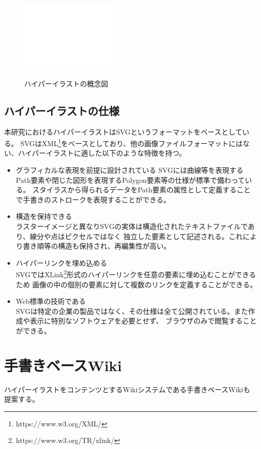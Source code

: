\begin{figure}[htbp]
    \begin{center}
    {\includegraphics[width=50mm]{images/testimage.png}} \end{center}
    \caption{ハイパーイラストの概念図}
\end{figure}

\subsection{ハイパーイラストの仕様}
本研究におけるハイパーイラストはSVG\cite{aboutsvg}というフォーマットをベースとしている。
SVGはXML\footnote{https://www.w3.org/XML/}をベースとしており、他の画像ファイルフォーマットにはない、ハイパーイラストに適した以下のような特徴を持つ。
\begin{itemize}
    \item グラフィカルな表現を前提に設計されている
    SVGには曲線等を表現するPath要素や閉じた図形を表現するPolygon要素等の仕様が標準で備わっている。
    スタイラスから得られるデータをPath要素の属性として定義することで手書きのストロークを表現することができる。
    \item 構造を保持できる\\
    ラスターイメージと異なりSVGの実体は構造化されたテキストファイルであり、線分や点はピクセルではなく
    独立した要素として記述される。これにより書き順等の構造も保持され、再編集性が高い。
    \item ハイパーリンクを埋め込める\\
    SVGではXLink\footnote{https://www.w3.org/TR/xlink/}形式のハイパーリンクを任意の要素に埋め込むことができるため
    画像の中の個別の要素に対して複数のリンクを定義することができる。
    \item Web標準の技術である\\
    SVGは特定の企業の製品ではなく、その仕様は全て公開されている。また作成や表示に特別なソフトウェアを必要とせず、
    ブラウザのみで閲覧することができる。
\end{itemize}

\section{手書きベースWiki}
ハイパーイラストをコンテンツとするWikiシステムである手書きベースWikiも提案する。


